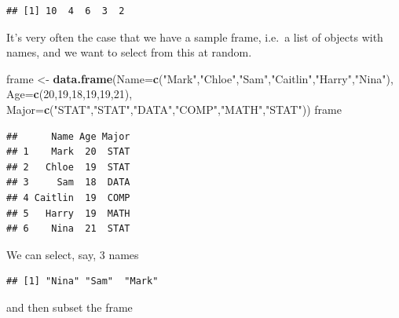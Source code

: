 \documentclass[
]{book}
\newenvironment{Shaded}{\begin{snugshade}}{\end{snugshade}}
\newcommand{\AttributeTok}[1]{\textcolor[rgb]{0.13,0.29,0.53}{#1}}
\newcommand{\DecValTok}[1]{\textcolor[rgb]{0.00,0.00,0.81}{#1}}
\newcommand{\FunctionTok}[1]{\textcolor[rgb]{0.13,0.29,0.53}{\textbf{#1}}}
\newcommand{\NormalTok}[1]{#1}
\newcommand{\OtherTok}[1]{\textcolor[rgb]{0.56,0.35,0.01}{#1}}
\newcommand{\SpecialCharTok}[1]{\textcolor[rgb]{0.81,0.36,0.00}{\textbf{#1}}}
\newcommand{\StringTok}[1]{\textcolor[rgb]{0.31,0.60,0.02}{#1}}
\begin{document}
\begin{verbatim}
## [1] 10  4  6  3  2
\end{verbatim}

It's very often the case that we have a sample frame, i.e.~a list of objects with names, and we
want to select from this at random.

\begin{Shaded}
\begin{Highlighting}[]
\NormalTok{frame }\OtherTok{\textless{}{-}} \FunctionTok{data.frame}\NormalTok{(}\AttributeTok{Name=}\FunctionTok{c}\NormalTok{(}\StringTok{"Mark"}\NormalTok{,}\StringTok{"Chloe"}\NormalTok{,}\StringTok{"Sam"}\NormalTok{,}\StringTok{"Caitlin"}\NormalTok{,}\StringTok{"Harry"}\NormalTok{,}\StringTok{"Nina"}\NormalTok{),}
                    \AttributeTok{Age=}\FunctionTok{c}\NormalTok{(}\DecValTok{20}\NormalTok{,}\DecValTok{19}\NormalTok{,}\DecValTok{18}\NormalTok{,}\DecValTok{19}\NormalTok{,}\DecValTok{19}\NormalTok{,}\DecValTok{21}\NormalTok{),}
                    \AttributeTok{Major=}\FunctionTok{c}\NormalTok{(}\StringTok{"STAT"}\NormalTok{,}\StringTok{"STAT"}\NormalTok{,}\StringTok{"DATA"}\NormalTok{,}\StringTok{"COMP"}\NormalTok{,}\StringTok{"MATH"}\NormalTok{,}\StringTok{"STAT"}\NormalTok{))}
\NormalTok{frame}
\end{Highlighting}
\end{Shaded}

\begin{verbatim}
##      Name Age Major
## 1    Mark  20  STAT
## 2   Chloe  19  STAT
## 3     Sam  18  DATA
## 4 Caitlin  19  COMP
## 5   Harry  19  MATH
## 6    Nina  21  STAT
\end{verbatim}

We can select, say, 3 names

\begin{Shaded}
\end{Shaded}

\begin{verbatim}
## [1] "Nina" "Sam"  "Mark"
\end{verbatim}

and then subset the frame

\begin{Shaded}
\end{Shaded}
\end{document}
